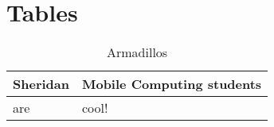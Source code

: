 \chapter{Tables}

\begin{table}
\caption{Armadillos}
\label{arm:tableB}
\begin{center}
\begin{tabular}{||l|l||}\hline
Sheridan & Mobile Computing students \\\hline
are	          & cool! \\\hline
\end{tabular}
\end{center}
\end{table}

\clearpage
\newpage
